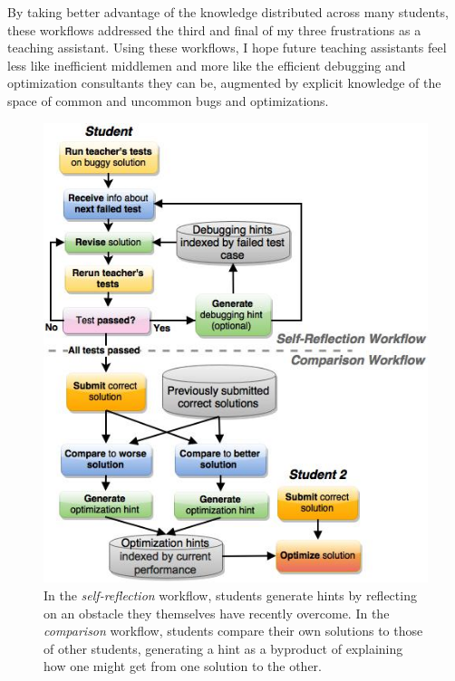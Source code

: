By taking better advantage of the knowledge distributed across many students, these workflows addressed the third and final of my three frustrations as a teaching assistant. Using these workflows, I hope future teaching assistants feel less like inefficient middlemen and more like the efficient debugging and optimization consultants they can be, augmented by explicit knowledge of the space of common and uncommon bugs and optimizations.%



\begin{figure}
\centering
\includegraphics[width=1.0\linewidth]{Body/figures/classoverflow/CombinedWorkflow_CameraReady_FIXED_2.jpg}
\caption{In the \textit{self-reflection} workflow, students generate hints by reflecting on an obstacle they themselves have recently overcome. In the \textit{comparison} workflow, students compare their own solutions to those of other students, generating a hint as a byproduct of explaining how one might get from one solution to the other.}
\label{fig:workflow}
\end{figure}


